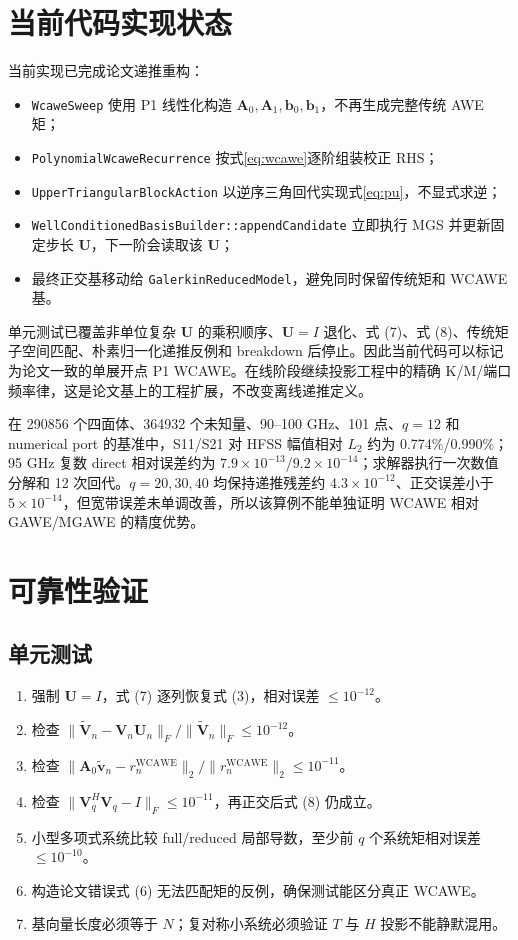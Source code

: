 \documentclass[11pt,a4paper]{ctexart}
\newcommand{\A}{\bm A}
\newcommand{\bvec}{\bm b}
\newcommand{\vvec}{\bm v}
\newcommand{\Umat}{\bm U}
\newcommand{\Vmat}{\bm V}
\begin{document}
\section{当前代码实现状态}
当前实现已完成论文递推重构：
\begin{itemize}
\item \texttt{WcaweSweep} 使用 P1 线性化构造 $\A_0,\A_1,\bvec_0,\bvec_1$，不再生成完整传统 AWE 矩；
\item \texttt{PolynomialWcaweRecurrence} 按式\eqref{eq:wcawe}逐阶组装校正 RHS；
\item \texttt{UpperTriangularBlockAction} 以逆序三角回代实现式\eqref{eq:pu}，不显式求逆；
\item \texttt{WellConditionedBasisBuilder::appendCandidate} 立即执行 MGS 并更新固定步长 $\Umat$，下一阶会读取该 $\Umat$；
\item 最终正交基移动给 \texttt{GalerkinReducedModel}，避免同时保留传统矩和 WCAWE 基。
\end{itemize}

单元测试已覆盖非单位复杂 $\Umat$ 的乘积顺序、$\Umat=I$ 退化、式 (7)、式 (8)、传统矩子空间匹配、朴素归一化递推反例和 breakdown 后停止。因此当前代码可以标记为论文一致的单展开点 P1 WCAWE。在线阶段继续投影工程中的精确 K/M/端口频率律，这是论文基上的工程扩展，不改变离线递推定义。

在 290856 个四面体、364932 个未知量、90--100 GHz、101 点、$q=12$ 和 numerical port 的基准中，S11/S21 对 HFSS 幅值相对 $L_2$ 约为 0.774\%/0.990\%；95 GHz 复数 direct 相对误差约为 $7.9\times10^{-13}$/$9.2\times10^{-14}$；求解器执行一次数值分解和 12 次回代。$q=20,30,40$ 均保持递推残差约 $4.3\times10^{-12}$、正交误差小于 $5\times10^{-14}$，但宽带误差未单调改善，所以该算例不能单独证明 WCAWE 相对 GAWE/MGAWE 的精度优势。

\section{可靠性验证}
\subsection{单元测试}
\begin{enumerate}
\item 强制 $\Umat=I$，式 (7) 逐列恢复式 (3)，相对误差 $\le10^{-12}$。
\item 检查 $\|\widetilde{\Vmat}_n-\Vmat_n\Umat_n\|_F/\|\widetilde{\Vmat}_n\|_F\le10^{-12}$。
\item 检查 $\|\A_0\widetilde{\vvec}_n-r_n^{\mathrm{WCAWE}}\|_2/\|r_n^{\mathrm{WCAWE}}\|_2\le10^{-11}$。
\item 检查 $\|\Vmat_q^H\Vmat_q-I\|_F\le10^{-11}$，再正交后式 (8) 仍成立。
\item 小型多项式系统比较 full/reduced 局部导数，至少前 $q$ 个系统矩相对误差 $\le10^{-10}$。
\item 构造论文错误式 (6) 无法匹配矩的反例，确保测试能区分真正 WCAWE。
\item 基向量长度必须等于 $N$；复对称小系统必须验证 $T$ 与 $H$ 投影不能静默混用。
\end{enumerate}
\end{document}

